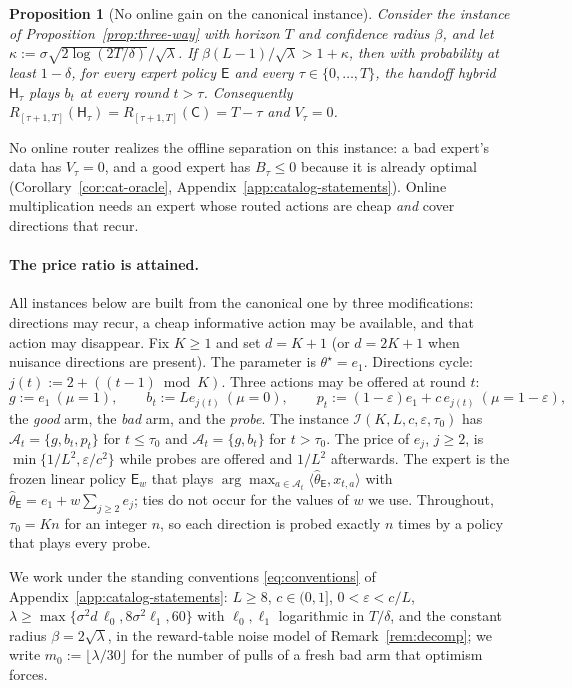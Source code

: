 \documentclass{article}
\newtheorem{proposition}{Proposition}
\theoremstyle{definition}
\theoremstyle{remark}
\newcommand{\eps}{\varepsilon}
\theoremstyle{remark}
\newcommand{\Cold}{\mathsf{C}}
\newcommand{\Exp}{\mathsf{E}}
\newcommand{\Hyb}{\mathsf{H}}
\begin{document}
\begin{proposition}[No online gain on the canonical instance]
\label{prop:one-pass}
Consider the instance of Proposition~\ref{prop:three-way} with horizon $T$
and confidence radius $\beta$, and let $\kappa:=\sigma\sqrt{2\log(2T/\delta)}/\sqrt\lambda$.
If $\beta(L-1)/\sqrt\lambda>1+\kappa$, then with probability at least
$1-\delta$, for \emph{every} expert policy $\Exp$ and every $\tau\in\{0,\dots,T\}$,
the handoff hybrid $\Hyb_\tau$ plays $b_t$ at every round $t>\tau$. Consequently
$R_{[\tau+1,T]}(\Hyb_\tau)=R_{[\tau+1,T]}(\Cold)=T-\tau$ and $V_\tau=0$.
\end{proposition}

No online router realizes the offline separation on this instance: a bad
expert's data has $V_\tau=0$, and a good expert has $B_\tau\le0$ because it is
already optimal (Corollary~\ref{cor:cat-oracle},
Appendix~\ref{app:catalog-statements}). Online multiplication needs an expert
whose routed actions are cheap \emph{and} cover directions that recur.

\paragraph{The price ratio is attained.}
All instances below are built from the canonical one by three modifications:
directions may recur, a cheap informative action may be available, and that
action may disappear. Fix $K\ge1$ and set $d=K+1$ (or $d=2K+1$ when nuisance
directions are present). The parameter is $\theta^\star=e_1$. Directions
cycle: $j(t):=2+((t-1)\bmod K)$. Three actions may be offered at round $t$:
\[
g:=e_1\ (\mu=1),\qquad
b_t:=Le_{j(t)}\ (\mu=0),\qquad
p_t:=(1-\eps)e_1+c\,e_{j(t)}\ (\mu=1-\eps),
\]
the \emph{good} arm, the \emph{bad} arm, and the \emph{probe}. The instance
$\mathcal I(K,L,c,\eps,\tau_0)$ has $\mathcal A_t=\{g,b_t,p_t\}$ for $t\le\tau_0$
and $\mathcal A_t=\{g,b_t\}$ for $t>\tau_0$. The price of $e_j$, $j\ge2$, is
$\min\{1/L^2,\eps/c^2\}$ while probes are offered and $1/L^2$ afterwards. The
expert is the frozen linear policy $\Exp_w$ that plays
$\arg\max_{a\in\mathcal A_t}\langle\widehat\theta_{\Exp},x_{t,a}\rangle$ with
$\widehat\theta_{\Exp}=e_1+w\sum_{j\ge2}e_j$; ties do not occur for the values
of $w$ we use. Throughout, $\tau_0=Kn$ for an integer $n$, so each direction is
probed exactly $n$ times by a policy that plays every probe.

We work under the standing conventions \eqref{eq:conventions} of
Appendix~\ref{app:catalog-statements}: $L\ge8$, $c\in(0,1]$, $0<\eps<c/L$,
$\lambda\ge\max\{\sigma^2d\,\ell_0,8\sigma^2\ell_1,60\}$ with $\ell_0,\ell_1$
logarithmic in $T/\delta$, and the constant radius $\beta=2\sqrt\lambda$, in
the reward-table noise model of Remark~\ref{rem:decomp}; we write
$m_0:=\lfloor\lambda/30\rfloor$ for the number of pulls of a fresh bad arm
that optimism forces.
\end{document}
